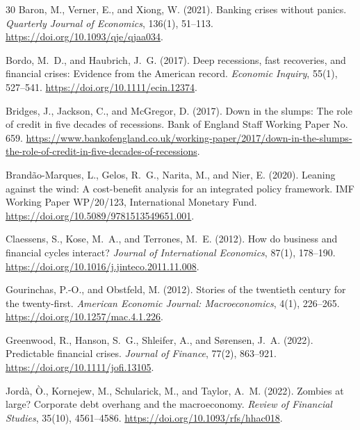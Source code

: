 \documentclass[11pt]{article}
\begin{document}
\begin{thebibliography}{30}
Baron, M., Verner, E., and Xiong, W. (2021).
\newblock Banking crises without panics.
\newblock \emph{Quarterly Journal of Economics}, 136(1), 51--113.
\newblock \url{https://doi.org/10.1093/qje/qjaa034}.

Bordo, M.~D., and Haubrich, J.~G. (2017).
\newblock Deep recessions, fast recoveries, and financial crises: Evidence from the American
  record.
\newblock \emph{Economic Inquiry}, 55(1), 527--541.
\newblock \url{https://doi.org/10.1111/ecin.12374}.

Bridges, J., Jackson, C., and McGregor, D. (2017).
\newblock Down in the slumps: The role of credit in five decades of recessions.
\newblock Bank of England Staff Working Paper No. 659.
\newblock \url{https://www.bankofengland.co.uk/working-paper/2017/down-in-the-slumps-the-role-of-credit-in-five-decades-of-recessions}.

Brand\~ao-Marques, L., Gelos, R.~G., Narita, M., and Nier, E. (2020).
\newblock Leaning against the wind: A cost-benefit analysis for an integrated policy
  framework.
\newblock IMF Working Paper WP/20/123, International Monetary Fund.
\newblock \url{https://doi.org/10.5089/9781513549651.001}.

Claessens, S., Kose, M.~A., and Terrones, M.~E. (2012).
\newblock How do business and financial cycles interact?
\newblock \emph{Journal of International Economics}, 87(1), 178--190.
\newblock \url{https://doi.org/10.1016/j.jinteco.2011.11.008}.

Gourinchas, P.-O., and Obstfeld, M. (2012).
\newblock Stories of the twentieth century for the twenty-first.
\newblock \emph{American Economic Journal: Macroeconomics}, 4(1), 226--265.
\newblock \url{https://doi.org/10.1257/mac.4.1.226}.

Greenwood, R., Hanson, S.~G., Shleifer, A., and S{\o}rensen, J.~A. (2022).
\newblock Predictable financial crises.
\newblock \emph{Journal of Finance}, 77(2), 863--921.
\newblock \url{https://doi.org/10.1111/jofi.13105}.

Jord\`a, \`O., Kornejew, M., Schularick, M., and Taylor, A.~M. (2022).
\newblock Zombies at large? Corporate debt overhang and the macroeconomy.
\newblock \emph{Review of Financial Studies}, 35(10), 4561--4586.
\newblock \url{https://doi.org/10.1093/rfs/hhac018}.


\end{thebibliography}
\end{document}
